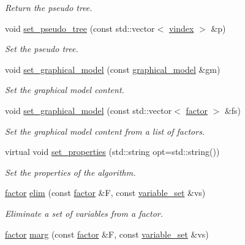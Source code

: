 \begin{DoxyCompactItemize}
\begin{DoxyCompactList}\small\item\em Return the pseudo tree. \end{DoxyCompactList}\item 
void \hyperlink{classmerlin_1_1jglp_a652e12b270f52c59cf6a795847650d74}{set\+\_\+pseudo\+\_\+tree} (const std\+::vector$<$ \hyperlink{classmerlin_1_1jglp_a85f09fc4dc206dd719f08d08b1db9591}{vindex} $>$ \&p)
\begin{DoxyCompactList}\small\item\em Set the pseudo tree. \end{DoxyCompactList}\item 
void \hyperlink{classmerlin_1_1jglp_a788df051ff307d477af55bab2d671321}{set\+\_\+graphical\+\_\+model} (const \hyperlink{classmerlin_1_1graphical__model}{graphical\+\_\+model} \&gm)
\begin{DoxyCompactList}\small\item\em Set the graphical model content. \end{DoxyCompactList}\item 
void \hyperlink{classmerlin_1_1jglp_ae02d2c472b62bbbed8f06896c2688bdf}{set\+\_\+graphical\+\_\+model} (const std\+::vector$<$ \hyperlink{classmerlin_1_1factor}{factor} $>$ \&fs)
\begin{DoxyCompactList}\small\item\em Set the graphical model content from a list of factors. \end{DoxyCompactList}\item 
virtual void \hyperlink{classmerlin_1_1jglp_a5acb4097355e635727d2b9818351ec8c}{set\+\_\+properties} (std\+::string opt=std\+::string())
\begin{DoxyCompactList}\small\item\em Set the properties of the algorithm. \end{DoxyCompactList}\item 
\hyperlink{classmerlin_1_1factor}{factor} \hyperlink{classmerlin_1_1jglp_a99dba3581cf03ae19380974d294297e7}{elim} (const \hyperlink{classmerlin_1_1factor}{factor} \&F, const \hyperlink{classmerlin_1_1variable__set}{variable\+\_\+set} \&vs)
\begin{DoxyCompactList}\small\item\em Eliminate a set of variables from a factor. \end{DoxyCompactList}\item 
\hyperlink{classmerlin_1_1factor}{factor} \hyperlink{classmerlin_1_1jglp_a9a4ce84cb6de5b2b3dabc216d6738126}{marg} (const \hyperlink{classmerlin_1_1factor}{factor} \&F, const \hyperlink{classmerlin_1_1variable__set}{variable\+\_\+set} \&vs)

\end{DoxyCompactItemize}
